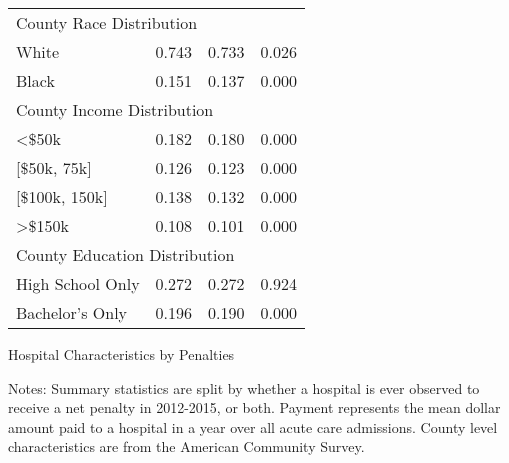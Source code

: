 \documentclass[12pt]{article}
\begin{document}
{\begin{tabular}{lccc}
\multicolumn{4}{l}{County Race Distribution}\\
\hspace{0.05in}White     &     0.743   &     0.733    &    0.026\\
\hspace{0.05in}Black    &     0.151  &      0.137   &     0.000\\
\multicolumn{4}{l}{County Income Distribution}\\
\hspace{0.05in}<$\$$50k   &    0.182   &     0.180      &  0.000\\
\hspace{0.05in}[$\$$50k, 75k]   &   0.126   &     0.123    &    0.000\\
\hspace{0.05in}[$\$$100k, 150k]       & 0.138     &   0.132  &      0.000\\
\hspace{0.05in}>$\$$150k   &    0.108    &    0.101 &       0.000\\
\multicolumn{4}{l}{County Education Distribution}\\
\hspace{0.05in}High School Only   &     0.272   &     0.272   &     0.924\\
\hspace{0.05in}Bachelor's Only      &     0.196    &    0.190   &     0.000\\
\hline
\end{tabular}
}
\setlength{\captionmargin}{.5 \textwidth} \addtolength{\captionmargin}{-.5\wd\gfxbox}
\begin{table}[!h]
\centering
\caption{Hospital Characteristics by Penalties}
\label{tab:bypenalty}
\usebox{\gfxbox}
\par
\begin{minipage}{\wd\gfxbox}
\footnotesize
Notes: Summary statistics are split by whether a hospital is ever observed to receive a net penalty in 2012-2015, or both. Payment represents the mean dollar amount paid to a hospital in a year over all acute care admissions.   County level characteristics are from the American Community Survey.
\end{minipage}
\end{table}
\end{document}
